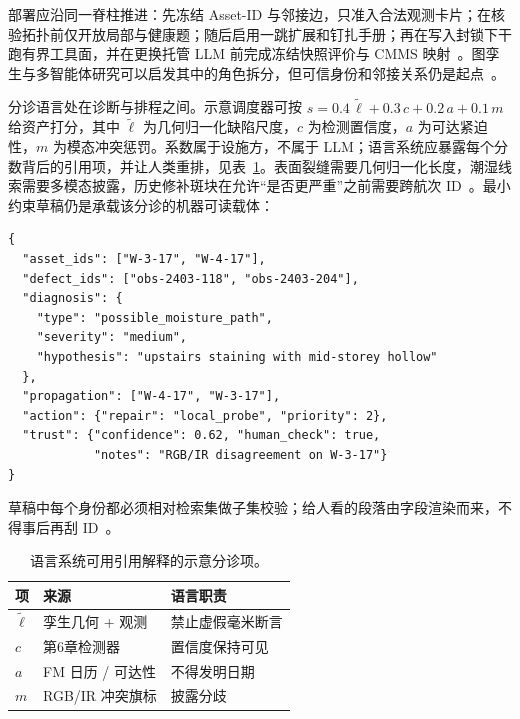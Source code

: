 部署应沿同一脊柱推进：先冻结 Asset-ID 与邻接边，只准入合法观测卡片；在核验拓扑前仅开放局部与健康题；随后启用一跳扩展和钉扎手册；再在写入封锁下干跑有界工具面，并在更换托管 LLM 前完成冻结快照评价与 CMMS 映射~\cite{zhang2025,zhao2026physical,peng2024,lee2024ragsafety,gao2026ifcagent,liang2023helm,ma2026tenquestions,buga2025llmfmsql}。图孪生与多智能体研究可以启发其中的角色拆分，但可信身份和邻接关系仍是起点~\cite{pan2026graphdtgpt,rawat2025llmmas,lu2026highwaymas}。

分诊语言处在诊断与排程之间。示意调度器可按 $s = 0.4\,\tilde{\ell} + 0.3\,c + 0.2\,a + 0.1\,m$ 给资产打分，其中 $\tilde{\ell}$ 为几何归一化缺陷尺度，$c$ 为检测置信度，$a$ 为可达紧迫性，$m$ 为模态冲突惩罚。系数属于设施方，不属于 LLM；语言系统应暴露每个分数背后的引用项，并让人类重排，见表~\ref{tab:ch8-triage}。表面裂缝需要几何归一化长度，潮湿线索需要多模态披露，历史修补斑块在允许``是否更严重''之前需要跨航次 ID~\cite{zhao2024facade,zhao2026physical,jeon2025hybridrag}。最小约束草稿仍是承载该分诊的机器可读载体：

\begin{verbatim}
{
  "asset_ids": ["W-3-17", "W-4-17"],
  "defect_ids": ["obs-2403-118", "obs-2403-204"],
  "diagnosis": {
    "type": "possible_moisture_path",
    "severity": "medium",
    "hypothesis": "upstairs staining with mid-storey hollow"
  },
  "propagation": ["W-4-17", "W-3-17"],
  "action": {"repair": "local_probe", "priority": 2},
  "trust": {"confidence": 0.62, "human_check": true,
            "notes": "RGB/IR disagreement on W-3-17"}
}
\end{verbatim}

草稿中每个身份都必须相对检索集做子集校验；给人看的段落由字段渲染而来，不得事后再刮 ID~\cite{zheng2023bimassistant,joffe2025buildingcodes}。

\begin{table}[htbp]
\centering
\caption{语言系统可用引用解释的示意分诊项。}
\label{tab:ch8-triage}
\begin{tabular}{llp{5.0cm}}
\toprule
项 & 来源 & 语言职责 \\
\midrule
$\tilde{\ell}$ & 孪生几何 + 观测 & 禁止虚假毫米断言 \\
$c$ & 第6章检测器 & 置信度保持可见 \\
$a$ & FM 日历 / 可达性 & 不得发明日期 \\
$m$ & RGB/IR 冲突旗标 & 披露分歧 \\
\bottomrule
\end{tabular}
\end{table}

